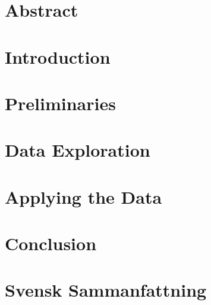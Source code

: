 \documentclass[a4paper, 12pt, oneside]{book}
\begin{document}

\tableofcontents 


\endgroup %

\clearpage
\pagestyle{plain}      
%

\chapter*{Abstract}


%

\chapter{Introduction}

\chapter{Preliminaries}
 

\chapter{Data Exploration}


\chapter{Applying the Data}


\chapter{Conclusion}


\chapter*{Svensk Sammanfattning}

\end{document}

